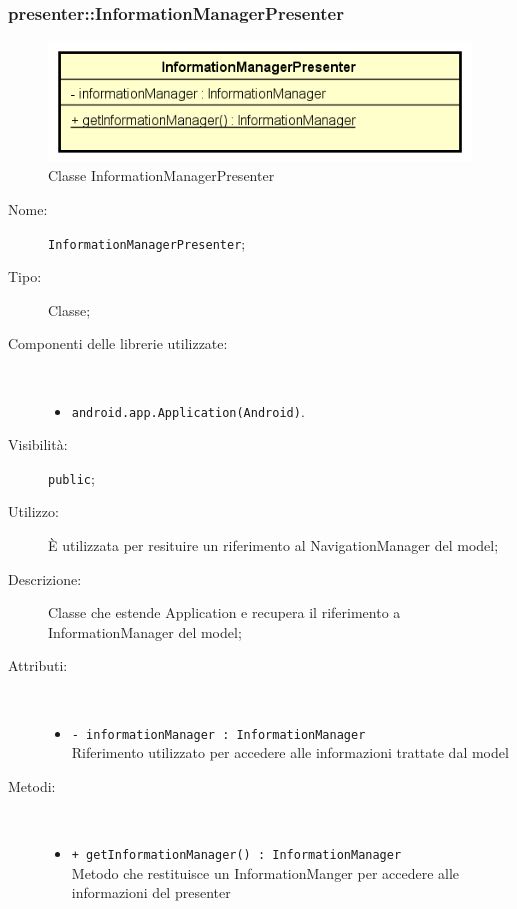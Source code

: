 \documentclass[../DefinizioneDiProdotto.tex]{subfiles}
\begin{document}
\subsubsection{presenter::InformationManagerPresenter}

    \begin{figure}[H]
        \centering
        \includegraphics{img/InformationManagerPresenter.png}
        \caption{Classe InformationManagerPresenter}\label{fig:presenter::InformationManagerPresenter} 
    \end{figure}
    \begin{description}
\item[Nome:] \texttt{InformationManagerPresenter};
\item[Tipo:] Classe;
\item[Componenti delle librerie utilizzate:] \
\begin{itemize}
\item \texttt{android.app.Application(Android)}.

\end{itemize}
\item[Visibilità:] \texttt{public};
\item[Utilizzo:] È utilizzata per resituire un riferimento al NavigationManager del model;
\item[Descrizione:] Classe che estende Application e recupera il riferimento a InformationManager del model;
\item[Attributi:] \
\begin{itemize}
\item \texttt{- informationManager : InformationManager}\\
Riferimento utilizzato per accedere alle informazioni trattate dal model

\end{itemize}
\item[Metodi:] \
\begin{itemize}
\item \texttt{+ getInformationManager() : InformationManager}\\
Metodo che restituisce un InformationManger per accedere alle informazioni del presenter
 \end{itemize}
\end{description}
\end{document}
